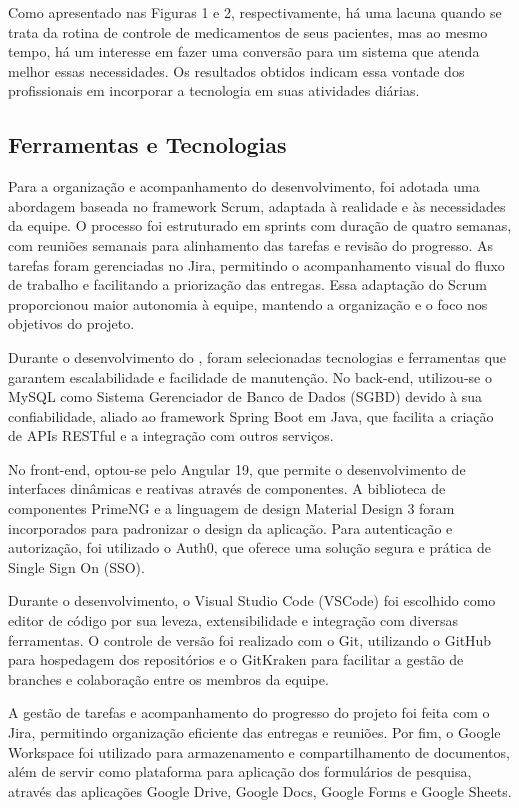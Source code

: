 \documentclass[
	article,			%
	12pt,				%
	oneside,			%
	a4paper,			%
    BIBLATEX,           %
	english,			%
	brazil,				%
	sumario=tradicional
	]{abntex2}
\begin{document}
\break

Como apresentado nas Figuras 1 e 2, respectivamente, há uma lacuna quando se trata da rotina de controle de medicamentos de seus pacientes, mas ao mesmo tempo, há um interesse em fazer uma conversão para um sistema que atenda melhor essas necessidades. Os resultados obtidos indicam essa vontade dos profissionais em incorporar a tecnologia em suas atividades diárias.

\subsection{Ferramentas e Tecnologias}

Para a organização e acompanhamento do desenvolvimento, foi adotada uma abordagem baseada no framework Scrum, adaptada à realidade e às necessidades da equipe. O processo foi estruturado em sprints com duração de quatro semanas, com reuniões semanais para alinhamento das tarefas e revisão do progresso. As tarefas foram gerenciadas no Jira, permitindo o acompanhamento visual do fluxo de trabalho e facilitando a priorização das entregas. Essa adaptação do Scrum proporcionou maior autonomia à equipe, mantendo a organização e o foco nos objetivos do projeto.

Durante o desenvolvimento do \nomeprojeto, foram selecionadas tecnologias e ferramentas que garantem escalabilidade e facilidade de manutenção. No back-end, utilizou-se o MySQL como Sistema Gerenciador de Banco de Dados (SGBD) devido à sua confiabilidade, aliado ao framework Spring Boot em Java, que facilita a criação de APIs RESTful e a integração com outros serviços.

No front-end, optou-se pelo Angular 19, que permite o desenvolvimento de interfaces dinâmicas e reativas através de componentes. A biblioteca de componentes PrimeNG e a linguagem de design Material Design 3 foram incorporados para padronizar o design da aplicação. Para autenticação e autorização, foi utilizado o Auth0, que oferece uma solução segura e prática de Single Sign On (SSO).

Durante o desenvolvimento, o Visual Studio Code (VSCode) foi escolhido como editor de código por sua leveza, extensibilidade e integração com diversas ferramentas. O controle de versão foi realizado com o Git, utilizando o GitHub para hospedagem dos repositórios e o GitKraken para facilitar a gestão de branches e colaboração entre os membros da equipe.

A gestão de tarefas e acompanhamento do progresso do projeto foi feita com o Jira, permitindo organização eficiente das entregas e reuniões. Por fim, o Google Workspace foi utilizado para armazenamento e compartilhamento de documentos, além de servir como plataforma para aplicação dos formulários de pesquisa, através das aplicações Google Drive, Google Docs, Google Forms e Google Sheets.
	
\end{document}
